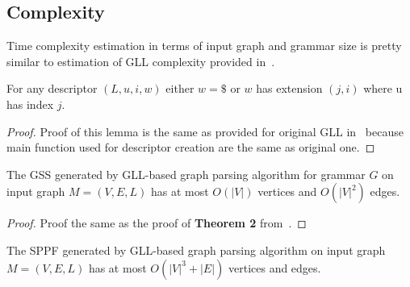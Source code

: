 \subsection{Complexity}

Time complexity estimation in terms of input graph and grammar size is pretty similar to estimation of GLL complexity provided in~\cite{gllParsingTree}.

\begin{lemma}\label{lem:Descriptors}
For any descriptor $(L,u,i,w)$ either $w = \$$ or $w$ has extension $(j,i)$ where u has index $j$.
\end{lemma}
\begin{proof}
Proof of this lemma is the same as provided for original GLL in~\cite{gllParsingTree} because main function used for descriptor creation are the same as original one.
\end{proof}


\begin{mytheorem}\label{thm:GSSSpace}
The GSS generated by GLL-based graph parsing algorithm for grammar $G$ on input graph $M=(V,E,L)$ has at most $O(|V|)$ vertices and $O(|V|^2)$ edges.
\end{mytheorem}

\begin{proof}

Proof the same as the proof of \textbf{Theorem 2} from~\cite{gllParsingTree}. 

\end{proof}

\begin{mytheorem}\label{thm:SPPFSpace}
The SPPF generated by GLL-based graph parsing algorithm on input graph $M=(V,E,L)$ has at most $O(|V|^3 + |E|)$ vertices and edges.
\end{mytheorem}

